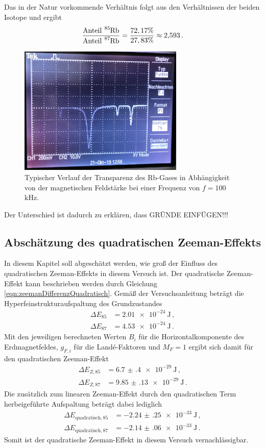 Das in der Natur vorkommende Verhältnis folgt aus den Verhältnissen der beiden Isotope \cite{verhältnis}
und ergibt
\begin{equation}
  \frac{\text{Anteil}~ \ce{^{85}Rb}}{\text{Anteil}~ \ce{^{87}Rb}}=\frac{72,17\%}{27,83\%} \approx 2{,}593 \,.
\end{equation}

\begin{figure}
  \centering
  \includegraphics[width=0.7\textwidth]{data/foto.jpg}
  \caption{Typischer Verlauf der Transparenz des Rb-Gases in Abhängigkeit von der magnetischen Feldstärke bei einer Frequenz von $f=100\,$kHz.}
  \label{fig:foto}
\end{figure}

Der Unterschied ist dadurch zu erklären, dass GRÜNDE EINFÜGEN!!!

\subsection{Abschätzung des quadratischen Zeeman-Effekts}
\label{subsec:zeeman}
In diesem Kapitel soll abgeschätzt werden, wie groß der Einfluss des quadratischen Zeeman-Effekts
in diesem Versuch ist. Der quadratische Zeeman-Effekt kann beschrieben werden durch Gleichung
\eqref{eqn:zeemanDifferenzQuadratisch}. Gemäß der Versuchsanleitung \cite{Versuchsanleitung} beträgt die
Hyperfeinstrukturaufspaltung des Grundzustandes
\begin{align*}
  \Delta E_{85}&= \SI{2.01e-24}{\joule}\,,\\
  \Delta E_{87}&= \SI{4.53e-24}{\joule}\,.
\end{align*}
Mit den jeweiligen berechneten Werten $B_i$ für die Horizontalkomponente des Erdmagnetfeldes,
$g_{F,i}$ für die Landé-Faktoren und $M_F=1$ ergibt sich damit für den quadratischen Zeeman-Effekt
\begin{align*}
  \Delta E_{Z,85}&=\SI{6.7(4)e-29}{\joule}\,,\\
  \Delta E_{Z,87}&=\SI{9.85(13)e-29}{\joule}\,.
\end{align*}
Die zusätzlich zum linearen Zeeman-Effekt durch den quadratischen Term herbeigeführte Aufspaltung beträgt dabei lediglich
\begin{align*}
  \Delta E_{\text{quadratisch},85}&=\SI{-2.24(25)e-33}{\joule}\,,\\
  \Delta E_{\text{quadratisch},87}&=\SI{-2.14(06)e-33}{\joule}\,.
\end{align*}
Somit ist der quadratische Zeeman-Effekt in diesem Versuch vernachlässigbar.

